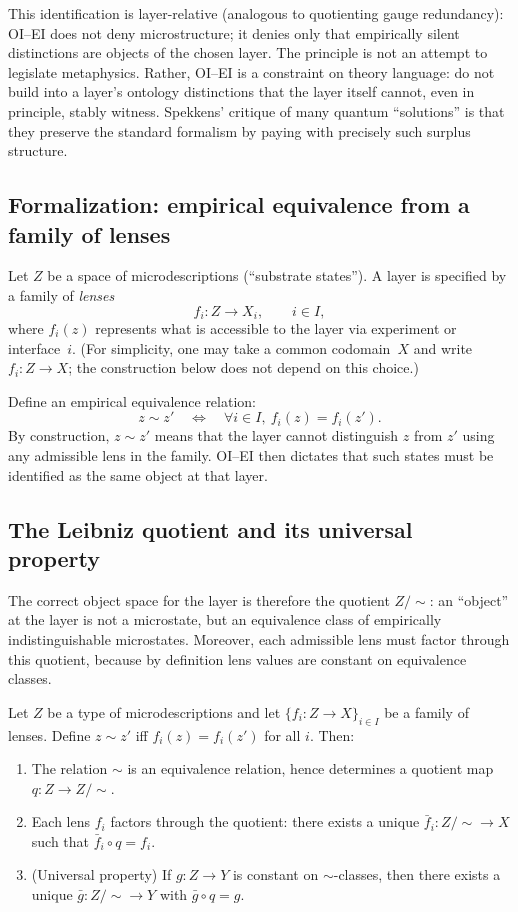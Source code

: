 This identification is layer-relative (analogous to quotienting gauge redundancy): OI--EI does not deny microstructure; it denies only that empirically silent distinctions are objects of the chosen layer.
The principle is not an attempt to legislate metaphysics. Rather, OI--EI is a constraint on theory language: do not build into a layer's ontology distinctions that the layer itself cannot, even in principle, stably witness. Spekkens' critique of many quantum ``solutions'' is that they preserve the standard formalism by paying with precisely such surplus structure.

\subsection{Formalization: empirical equivalence from a family of lenses}

Let $Z$ be a space of microdescriptions (``substrate states''). A layer is specified by a family of \emph{lenses}
\[
 f_i : Z \to X_i,\qquad i\in I,
\]
where $f_i(z)$ represents what is accessible to the layer via experiment or interface~$i$.
(For simplicity, one may take a common codomain~$X$ and write $f_i : Z\to X$; the construction below does not depend on this choice.)

Define an empirical equivalence relation:
\[
 z \sim z' \quad\Longleftrightarrow\quad \forall i\in I,\ f_i(z)=f_i(z').
\]
By construction, $z\sim z'$ means that the layer cannot distinguish $z$ from $z'$ using any admissible lens in the family. OI--EI then dictates that such states must be identified as the same object at that layer.

\subsection{The Leibniz quotient and its universal property}

The correct object space for the layer is therefore the quotient $Z/{\sim}$: an ``object'' at the layer is not a microstate, but an equivalence class of empirically indistinguishable microstates.
Moreover, each admissible lens must factor through this quotient, because by definition lens values are constant on equivalence classes.

\begin{theorem}\label{thm:leibniz-quotient}
Let $Z$ be a type of microdescriptions and let $\{f_i : Z\to X\}_{i\in I}$ be a family of lenses. Define $z\sim z'$ iff $f_i(z)=f_i(z')$ for all $i$.
Then:
\begin{enumerate}
  \item The relation $\sim$ is an equivalence relation, hence determines a quotient map $q: Z\to Z/{\sim}$.
  \item Each lens $f_i$ factors through the quotient: there exists a unique $\bar f_i : Z/{\sim}\to X$ such that $\bar f_i\circ q = f_i$.
  \item (Universal property) If $g:Z\to Y$ is constant on $\sim$-classes, then there exists a unique $\bar g: Z/{\sim}\to Y$ with $\bar g\circ q = g$.
\end{enumerate}
\end{theorem}

